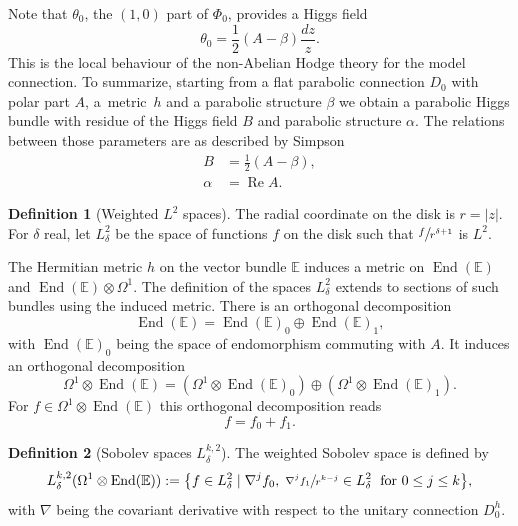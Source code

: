 \documentclass[JEP,XML,SOM,NoEqCountersInSection,Unicode,published]{cedram}
\theoremstyle{definition}
\newtheorem{definition}{Definition}[section]
\theoremstyle{plain}
\DeclareMathOperator{\End}{End}
\DeclareMathOperator{\Ree}{Re}
\begin{document}
Note that $\theta_0$, the $(1,0)$ part of $\Phi_0$, provides a Higgs field
\[
\theta_0 = \frac{1}{2} \left(A - \beta\right)\frac{d z}{z}.
\]
This is the local behaviour of the non-Abelian Hodge theory for the model connection.
To summarize, starting from a flat parabolic connection $D_0$ with polar part $A$, a~metric~$h$ and a parabolic structure $\beta$ we obtain a parabolic Higgs bundle with residue of the Higgs field $B$ and parabolic structure $\alpha$. The relations between those parameters are as described by Simpson \cite{Simpson}
\begin{equation}\label{eq_nah_parameters}
\begin{split}
B &= \frac{1}{2}(A - \beta),\\
\alpha &= \Ree A.
\end{split}
\end{equation}

\label{subsect_local_weighted}
\begin{definition}[Weighted $L^2$ spaces]
The radial coordinate on the disk is $r=|z|$. For $\delta$ real, let $L^2_{\delta}$ be the space of functions $f$ on the disk such that $\sfrac{f}{r^{\delta+1}}$ is $L^2$.
\end{definition}
The Hermitian metric $h$ on the vector bundle $\mathbb{E}$ induces a metric on $\End (\mathbb E)$ and $\End (\mathbb E)\otimes \Omega^1$. The definition of the spaces $L^2_{\delta}$ extends to sections of such bundles using the induced metric. There is an orthogonal decomposition
\begin{equation}\label{eq_end_E}
\End(\mathbb{E}) = \End(\mathbb{E})_0 \oplus \End(\mathbb{E})_1,
\end{equation}
with $\End(\mathbb{E})_0$ being the space of endomorphism commuting with $A$. It induces an orthogonal decomposition
\[
\Omega^1 \otimes \End(\mathbb{E}) =(\Omega^1 \otimes \End (\mathbb{E})_0) \oplus(\Omega^1 \otimes \End (\mathbb{E})_1).
\]
For $f\in \Omega^1\otimes \End(\mathbb{E}) $ this orthogonal decomposition reads
\[
f=f_0 +f_1.
\]

\begin{definition}[Sobolev spaces $L^{k,2}_{\delta}$]
The weighted Sobolev space is defined by
\[
L^{k,2}_{\delta}(\Omega^1\otimes\End (\mathbb{E})) :=\bigl\lbrace f \in L^2_{\delta} \mid \nabla^j f_0, \; \sfrac{\nabla^j f_1}{r^{k-j}} \in L^{2}_{\delta} \; \text{ for }0\le j \le k\bigr\rbrace,
\]
with $\nabla$ being the covariant derivative with respect to the unitary connection $D_0^h$.
\end{definition}
\end{document}
